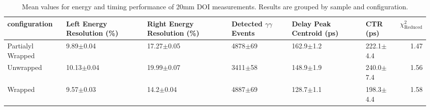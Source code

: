 \begin{table}
\caption{\label{doictrresults-20} Mean values for energy and timing performance of 20mm DOI measurements. Results are grouped by sample and configuration.}
\begin{tabular}{llllllr}
\hline
configuration & Left Energy Resolution (\%) & Right Energy Resolution (\%) & Detected $\gamma\gamma$ Events & Delay Peak Centroid (ps)  & CTR (ps) &  $\chi^2_\text{Reduced}$ \\
\hline
Partialyl Wrapped   &        9.89$\pm$0.04 &   17.27$\pm$0.05 &  4878$\pm$69 &  162.9$\pm$1.2 &  222.1$\pm$4.4 &        1.47 \\
Unwrapped     &       10.13$\pm$0.04 &   19.99$\pm$0.07 &  3411$\pm$58 &  148.9$\pm$1.9 &  240.0$\pm$7.4 &        1.56 \\
Wrapped       &        9.57$\pm$0.03 &    14.2$\pm$0.04 &  4887$\pm$69 &  128.7$\pm$1.1 &  198.3$\pm$4.4 &        1.58 \\
\hline
\end{tabular}
\end{table}